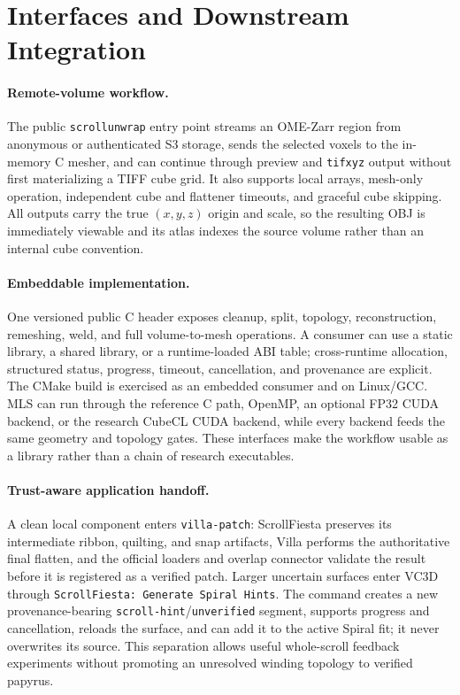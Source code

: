 \section{Interfaces and Downstream Integration}
\label{sec:integration}

\paragraph{Remote-volume workflow.} The public \texttt{scrollunwrap} entry point streams an OME-Zarr region from anonymous or authenticated S3 storage, sends the selected voxels to the in-memory C mesher, and can continue through preview and \texttt{tifxyz} output without first materializing a TIFF cube grid. It also supports local arrays, mesh-only operation, independent cube and flattener timeouts, and graceful cube skipping. All outputs carry the true $(x,y,z)$ origin and scale, so the resulting OBJ is immediately viewable and its atlas indexes the source volume rather than an internal cube convention.

\paragraph{Embeddable implementation.} One versioned public C header exposes cleanup, split, topology, reconstruction, remeshing, weld, and full volume-to-mesh operations. A consumer can use a static library, a shared library, or a runtime-loaded ABI table; cross-runtime allocation, structured status, progress, timeout, cancellation, and provenance are explicit. The CMake build is exercised as an embedded consumer and on Linux/GCC. MLS can run through the reference C path, OpenMP, an optional FP32 CUDA backend, or the research CubeCL CUDA backend, while every backend feeds the same geometry and topology gates. These interfaces make the workflow usable as a library rather than a chain of research executables.

\paragraph{Trust-aware application handoff.} A clean local component enters \texttt{villa-patch}: ScrollFiesta preserves its intermediate ribbon, quilting, and snap artifacts, Villa performs the authoritative final flatten, and the official loaders and overlap connector validate the result before it is registered as a verified patch. Larger uncertain surfaces enter VC3D through \texttt{ScrollFiesta: Generate Spiral Hints}. The command creates a new provenance-bearing \texttt{scroll-hint}/\texttt{unverified} segment, supports progress and cancellation, reloads the surface, and can add it to the active Spiral fit; it never overwrites its source. This separation allows useful whole-scroll feedback experiments without promoting an unresolved winding topology to verified papyrus.

